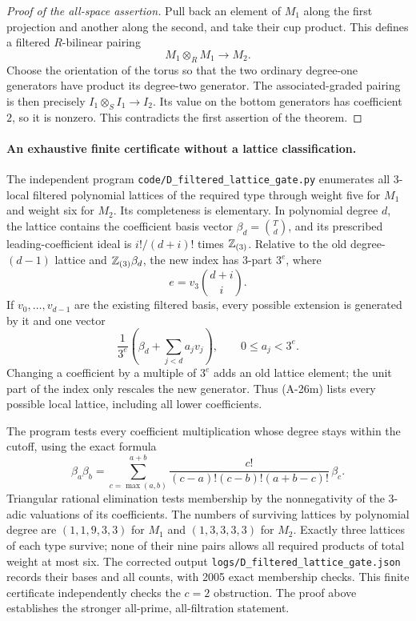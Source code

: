 \begin{proof}[Proof of the all-space assertion]
Pull back an element of \(M_1\) along the first projection
and another along the second, and take their cup product.
This defines a filtered \(R\)-bilinear pairing
\[
 M_1\otimes_R M_1\longrightarrow M_2.
\]
Choose the orientation of the torus so that the two ordinary
degree-one generators have product its degree-two generator.
The associated-graded pairing is then precisely
\(I_1\otimes_S I_1\to I_2\). Its value on the bottom generators
has coefficient \(2\), so it is nonzero. This contradicts the
first assertion of the theorem.
\end{proof}

\paragraph{An exhaustive finite certificate without a lattice classification.}
The independent program
\texttt{code/D\_filtered\_lattice\_gate.py} enumerates all
\(3\)-local filtered polynomial lattices of the required type
through weight five for \(M_1\) and weight six for \(M_2\).
Its completeness is elementary. In polynomial degree \(d\),
the lattice contains the coefficient basis vector
\(\beta_d=\binom Td\), and its prescribed leading-coefficient
ideal is \(i!/(d+i)!\) times \(\mathbb Z_{(3)}\).
Relative to the old degree-\((d-1)\) lattice and
\(\mathbb Z_{(3)}\beta_d\), the new index has \(3\)-part
\(3^e\), where
\[
 e=v_3\binom{d+i}{i}.
\]
If \(v_0,\ldots,v_{d-1}\) are the existing filtered basis,
every possible extension is generated by it and one vector
\[
 \frac{1}{3^e}
       \left(\beta_d+\sum_{j<d}a_jv_j\right),
       \qquad 0\le a_j<3^e.
 \tag{A-26m}
\]
Changing a coefficient by a multiple of \(3^e\) adds an
old lattice element; the unit part of the index only
rescales the new generator. Thus (A-26m) lists every
possible local lattice, including all lower coefficients.

The program tests every coefficient multiplication whose
degree stays within the cutoff, using the exact formula
\[
 \beta_a\beta_b=
 \sum_{c=\max(a,b)}^{a+b}
 \frac{c!}{(c-a)!(c-b)!(a+b-c)!}\,\beta_c.
\]
Triangular rational elimination tests membership by the
nonnegativity of the \(3\)-adic valuations of its coefficients.
The numbers of surviving lattices by polynomial degree are
\((1,1,9,3,3)\) for \(M_1\) and \((1,3,3,3,3)\) for \(M_2\).
Exactly three lattices of each type survive; none of their
nine pairs allows all required products of total weight
at most six. The corrected output
\texttt{logs/D\_filtered\_lattice\_gate.json} records their
bases and all counts, with 2005 exact membership checks.
This finite certificate independently checks the \(c=2\)
obstruction. The proof above establishes the stronger
all-prime, all-filtration statement.
